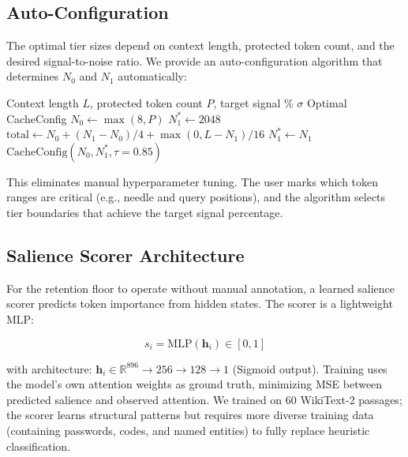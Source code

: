 \documentclass[11pt]{article}
\begin{document}
\subsection{Auto-Configuration}

The optimal tier sizes depend on context length, protected token count, and the desired signal-to-noise ratio. We provide an auto-configuration algorithm that determines $N_0$ and $N_1$ automatically:

\begin{algorithm}[ht]
\caption{Auto-Configuration of Tier Geometry}
\begin{algorithmic}[1]
\Require Context length $L$, protected token count $P$, target signal \% $\sigma$
\Ensure Optimal CacheConfig
\State $N_0 \gets \max(8, P)$ 
\State $N_1^* \gets 2048$ 
    \State $\text{total} \gets N_0 + (N_1 - N_0)/4 + \max(0, L - N_1)/16$
        \State $N_1^* \gets N_1$
    \EndIf
\EndFor
\State \Return $\text{CacheConfig}(N_0, N_1^*, \tau{=}0.85)$
\end{algorithmic}
\end{algorithm}

This eliminates manual hyperparameter tuning. The user marks which token ranges are critical (e.g., needle and query positions), and the algorithm selects tier boundaries that achieve the target signal percentage.

\subsection{Salience Scorer Architecture}
\label{sec:scorer}

For the retention floor to operate without manual annotation, a learned salience scorer predicts token importance from hidden states. The scorer is a lightweight MLP:

\begin{equation}
s_i = \text{MLP}(\mathbf{h}_i) \in [0,1]
\end{equation}

with architecture: $\mathbf{h}_i \in \mathbb{R}^{896} \rightarrow 256 \rightarrow 128 \rightarrow 1$ (Sigmoid output). Training uses the model's own attention weights as ground truth, minimizing MSE between predicted salience and observed attention. We trained on 60 WikiText-2 passages; the scorer learns structural patterns but requires more diverse training data (containing passwords, codes, and named entities) to fully replace heuristic classification.
\end{document}
